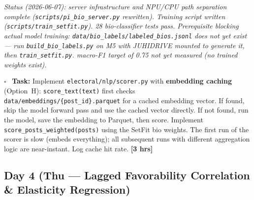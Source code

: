 \documentclass[11pt]{article}
\newcommand{\hrs}[1]{\textbf{[#1 hrs]}}
\newcommand{\dayhead}[2]{%
  \subsection*{Day #1 \normalfont\small\color{codegray}(#2)}}
\newcommand{\task}[2]{%
  \noindent\textbf{Task:} #1 \hfill \hrs{#2}\\}
\newcommand{\done}{\textcolor{sectionblue}{$\square$}\ }
\begin{document}
\begin{taskbox}
  \textit{Status (2026-06-07): server infrastructure and NPU/CPU path separation
  complete (\texttt{scripts/pi\_bio\_server.py} rewritten). Training script written
  (\texttt{scripts/train\_setfit.py}). 28 bio-classifier tests pass. Prerequisite
  blocking actual model training: \texttt{data/bio\_labels/labeled\_bios.jsonl}
  does not yet exist --- run \texttt{build\_bio\_labels.py} on M5 with JUHIDRIVE
  mounted to generate it, then \texttt{train\_setfit.py}. macro-F1 target of 0.75
  not yet measured (no trained weights exist).}

\done \task{Implement \texttt{electoral/nlp/scorer.py} with \textbf{embedding
  caching} (Option~H): \texttt{score\_text(text)} first checks
  \texttt{data/embeddings/\{post\_id\}.parquet} for a cached embedding vector.
  If found, skip the model forward pass and use the cached vector directly.
  If not found, run the model, save the embedding to Parquet, then score.
  Implement \texttt{score\_posts\_weighted(posts)} using the SetFit bio weights.
  The first run of the scorer is slow (embeds everything); all subsequent runs
  with different aggregation logic are near-instant. Log cache hit rate.}{3}
\end{taskbox}

\dayhead{4}{Thu --- Lagged Favorability Correlation \& Elasticity Regression}
\end{document}
